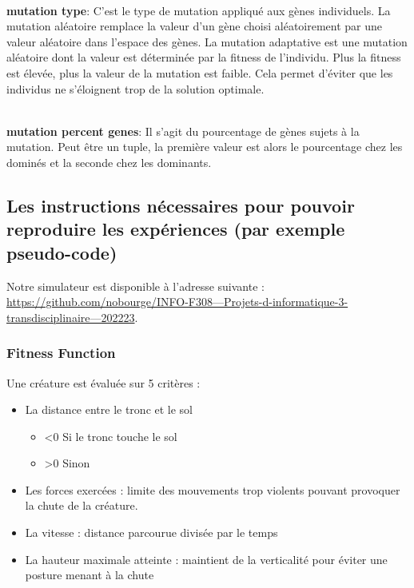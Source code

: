 \documentclass[journal, a4paper]{IEEEtran}
\begin{document}
    \\ \textbf{mutation type}: C'est le type de mutation appliqué aux
	gènes individuels. La mutation aléatoire remplace la valeur d'un
	gène choisi aléatoirement par une valeur aléatoire dans l'espace
	des
	gènes.
	La mutation adaptative est une mutation aléatoire dont la valeur
	est déterminée par la fitness de l'individu. Plus la fitness est
	élevée, plus la valeur de la mutation est faible. Cela permet
	d'éviter que les individus ne s'éloignent trop de la solution
	optimale.

    \\ \textbf{mutation percent genes}: Il s'agit du pourcentage de
	gènes sujets à la mutation. Peut être un tuple, la première valeur
	est alors le pourcentage chez les dominés et la seconde chez les
	dominants.


	\subsection{Les instructions nécessaires pour pouvoir reproduire les expériences (par exemple pseudo-code)}\label{subsec:les-instructions-necessaires-pour-pouvoir-reproduire-les-experiences-(par-exemple-pseudo-code)}
	Notre  simulateur  est  disponible  à  l’adresse  suivante  :
	\href{https://github.com/nobourge/INFO-F308---Projets-d-informatique-3-transdisciplinaire---202223}{https://github.com/nobourge/INFO-F308---Projets-d-informatique-3-transdisciplinaire---202223}.

	\subsubsection{Fitness Function}
		Une créature est évaluée sur 5 critères :
		\begin{itemize}
			\item La distance entre le tronc et le sol 
			\begin{itemize}
				\item <0 Si le tronc touche le sol
				\item >0 Sinon
			\end{itemize}
			\item Les forces exercées : limite des mouvements
			trop violents pouvant provoquer la chute de la créature.
			\item La vitesse : distance parcourue divisée par le temps
			\item La hauteur maximale atteinte : maintient de la verticalité
			pour éviter une posture menant à la chute
		\end{itemize}
\end{document}
